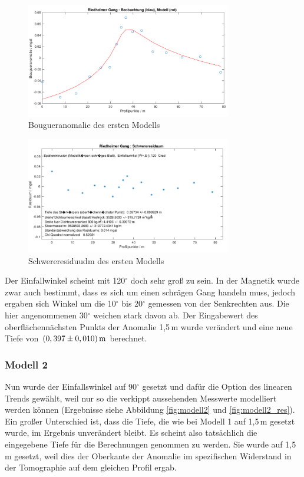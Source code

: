 \begin{figure}[!ht]
 \centering
 \includegraphics[width=0.8\textwidth]{fig/modell1}
 \caption{Bougueranomalie des ersten Modells}
 \label{fig:modell1}
\end{figure}

\begin{figure}[!ht]
 \centering
 \includegraphics[width=0.8\textwidth]{fig/modell1_res}
 \caption{Schwereresiduudm des ersten Modells}
 \label{fig:modell1_res}
\end{figure}

Der Einfallwinkel scheint mit 120$^\circ$ doch sehr groß zu sein. In der Magnetik wurde zwar auch bestimmt, dass es sich um einen schrägen Gang handeln muss, jedoch ergaben sich Winkel um die 10$^\circ$ bis 20$^\circ$ gemessen von der Senkrechten aus. Die hier angenommenen 30$^\circ$ weichen stark davon ab. Der Eingabewert des oberflächennächsten Punkts der Anomalie 1,5\,m wurde verändert und eine neue Tiefe von $(0,397\pm0,010)\,\mathrm{m}$ berechnet.

\subsubsection{Modell 2}

Nun wurde der Einfallswinkel auf 90$^\circ$ gesetzt und dafür die Option des linearen Trends gewählt, weil nur so die verkippt aussehenden Messwerte modelliert werden können (Ergebnisse siehe Abbildung \ref{fig:modell2} und \ref{fig:modell2_res}). Ein großer Unterschied ist, dass die Tiefe, die wie bei Modell 1 auf 1,5\,m gesetzt wurde, im Ergebnis unverändert bleibt. Es scheint also tatsächlich die eingegebene Tiefe für die Berechnungen genommen zu werden. Sie wurde auf 1,5\,m gesetzt, weil dies der Oberkante der Anomalie im spezifischen Widerstand in der Tomographie auf dem gleichen Profil ergab.

